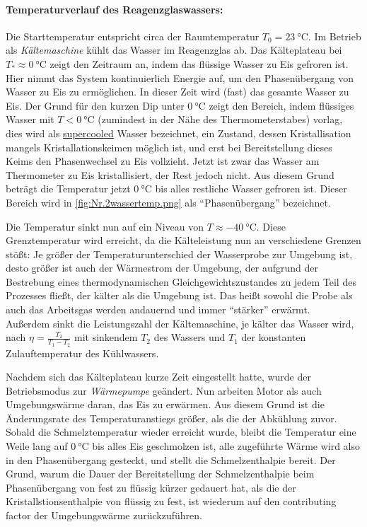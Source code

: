 \paragraph{Temperaturverlauf des Reagenzglaswassers:}
Die Starttemperatur entspricht circa der Raumtemperatur \(T_0=\qty{23}{\degreeCelsius}\). 
Im Betrieb als \textit{Kältemaschine} kühlt das Wasser im Reagenzglas ab. Das Kälteplateau bei \(T_*\approx\qty{0}{\degreeCelsius}\) zeigt den Zeitraum an, indem das flüssige Wasser zu Eis gefroren ist. Hier nimmt das System kontinuierlich Energie auf, um den Phasenübergang von Wasser zu Eis zu ermöglichen. In dieser Zeit wird (fast) das gesamte Wasser zu Eis. Der Grund für den kurzen Dip unter \(\qty{0}{\degreeCelsius}\) zeigt den Bereich, indem flüssiges Wasser mit \(T<\qty{0}{\degreeCelsius}\) (zumindest in der Nähe des Thermometerstabes) vorlag, dies wird als \href{https://en.wikipedia.org/wiki/Supercooling}{supercooled} Wasser bezeichnet, ein Zustand, dessen Kristallisation mangels Kristallationskeimen möglich ist, und erst bei Bereitstellung dieses Keims den Phasenwechsel zu Eis vollzieht. Jetzt ist zwar das Wasser am Thermometer zu Eis kristallisiert, der Rest jedoch nicht. Aus diesem Grund beträgt die Temperatur jetzt \(\qty{0}{\degreeCelsius}\) bis alles restliche Wasser gefroren ist. Dieser Bereich wird in \cref{fig:Nr.2wassertemp.png} als \enquote{Phasenübergang} bezeichnet. 

Die Temperatur sinkt nun auf ein Niveau von \(T\approx\qty{-40}{\degreeCelsius}\). Diese Grenztemperatur wird erreicht, da die Kälteleistung nun an verschiedene Grenzen stößt: Je größer der Temperaturunterschied der Wasserprobe zur Umgebung ist, desto größer ist auch der Wärmestrom der Umgebung, der aufgrund der Bestrebung eines thermodynamischen Gleichgewichtszustandes zu jedem Teil des Prozesses fließt, der kälter als die Umgebung ist. Das heißt sowohl die Probe als auch das Arbeitsgas werden andauernd und immer \enquote{stärker} erwärmt.\\
Außerdem sinkt die Leistungszahl der Kältemaschine, je kälter das Wasser wird, nach \(\eta=\frac{T_2}{T_1-T_2}\) mit sinkendem \(T_2\) des Wassers und \(T_1\) der konstanten Zulauftemperatur des Kühlwassers.    

Nachdem sich das Kälteplateau kurze Zeit eingestellt hatte, wurde der Betriebsmodus zur \textit{Wärmepumpe} geändert. Nun arbeiten Motor als auch Umgebungswärme daran, das Eis zu erwärmen. Aus diesem Grund ist die Änderungsrate des Temperaturanstiegs größer, als die der Abkühlung zuvor. Sobald die Schmelztemperatur wieder erreicht wurde, bleibt die Temperatur eine Weile lang auf \(\qty{0}{\degreeCelsius}\) bis alles Eis geschmolzen ist, alle zugeführte Wärme wird also in den Phasenübergang gesteckt, und stellt die Schmelzenthalpie bereit. Der Grund, warum die Dauer der Bereitstellung der Schmelzenthalpie beim Phasenübergang von fest zu flüssig kürzer gedauert hat, als die der Kristallstionsenthalpie von flüssig zu fest, ist wiederum auf den contributing factor der Umgebungswärme zurückzuführen. 

